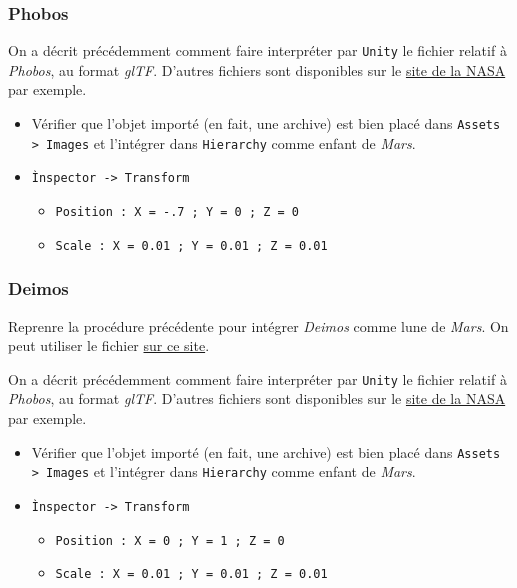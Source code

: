 \documentclass[a4paper,10pt]{article}
\newenvironment{solution}%
{\begin{tcolorbox}[breakable,colback=red!5!white,colframe=red!75!black,title=Solution]}%
{\end{tcolorbox}}
\begin{document}
\begin{solution}
\subsubsection{Phobos}
On a décrit précédemment comment faire interpréter par \texttt{Unity} le fichier relatif à \textit{Phobos}, au format \textit{glTF}. D'autres fichiers sont disponibles sur le \href{https://solarsystem.nasa.gov/resources/2358/phobos-3d-model/}{site de la NASA} par exemple.

\begin{itemize}
	\item  Vérifier que l'objet importé (en fait, une archive) est bien placé dans \texttt{Assets > Images} et l'intégrer dans  \texttt{Hierarchy} comme enfant de \textit{Mars}.
	\item \texttt{Ìnspector -> Transform}
	\begin{itemize}
		\item \texttt{Position : X = -.7 ; Y = 0 ; Z = 0 }
		\item \texttt{Scale : X = 0.01 ; Y = 0.01 ; Z = 0.01} 
	\end{itemize}	
\end{itemize}


\subsubsection{Deimos}
Reprenre la procédure précédente pour intégrer \textit{Deimos} comme lune de \textit{Mars}. On peut utiliser le fichier \href{https://science.nasa.gov/resource/deimos-3d-model/}{sur ce site}.

On a décrit précédemment comment faire interpréter par \texttt{Unity} le fichier relatif à \textit{Phobos}, au format \textit{glTF}. D'autres fichiers sont disponibles sur le \href{https://solarsystem.nasa.gov/resources/2358/phobos-3d-model/}{site de la NASA} par exemple.

\begin{itemize}
	\item  Vérifier que l'objet importé (en fait, une archive) est bien placé dans \texttt{Assets > Images} et l'intégrer dans  \texttt{Hierarchy} comme enfant de \textit{Mars}.
	\item \texttt{Ìnspector -> Transform}
	\begin{itemize}
		\item \texttt{Position : X = 0 ; Y = 1 ; Z = 0 }
		\item \texttt{Scale : X = 0.01 ; Y = 0.01 ; Z = 0.01} 
	\end{itemize}	
\end{itemize}

\end{solution}
\fi 
\end{document}
